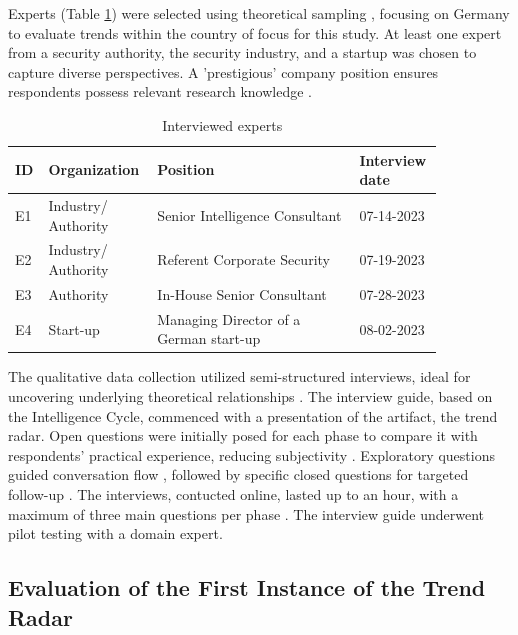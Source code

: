 \documentclass[10pt]{article}
\begin{document}
Experts (Table \ref{tab:experts}) were selected using theoretical sampling \cite{Glaser.1967}, focusing on Germany to evaluate trends within the country of focus for this study. At least one expert from a security authority, the security industry, and a startup was chosen to capture diverse perspectives. A 'prestigious' company position ensures respondents possess relevant research knowledge \cite{Bogner.2002b}.

\begin{table}[hbtp]
    \caption{Interviewed experts}
    \begin{tabular}{p{0.05\linewidth}p{0.2\linewidth}p{0.45\linewidth}p{0.15\linewidth}}
        \toprule
        \textbf{ID} & \textbf{Organization} & \textbf{Position}                      & \textbf{Interview date} \\
        \hline
        E1          & Industry/ Authority   & Senior Intelligence Consultant         & 07-14-2023              \\
        \hline
        E2          & Industry/ Authority   & Referent Corporate Security            & 07-19-2023              \\
        \hline
        E3          & Authority             & In-House Senior Consultant             & 07-28-2023              \\
        \hline
        E4          & Start-up              & Managing Director of a German start-up & 08-02-2023              \\
        \bottomrule
    \end{tabular}
    \label{tab:experts}
\end{table}
The qualitative data collection utilized semi-structured interviews, ideal for uncovering underlying theoretical relationships \cite{Bogner.2014}. The interview guide, based on the Intelligence Cycle, commenced with a presentation of the artifact, the trend radar. Open questions were initially posed for each phase to compare it with respondents' practical experience, reducing subjectivity \cite{Saunders.2012}. Exploratory questions guided conversation flow \cite{Saunders.2012}, followed by specific closed questions for targeted follow-up \cite{Saunders.2012}. The interviews, contucted online, lasted up to an hour, with a maximum of three main questions per phase \cite{Bogner.2014}. The interview guide underwent pilot testing with a domain expert.

\subsection{Evaluation of the First Instance of the Trend Radar}
\end{document}
